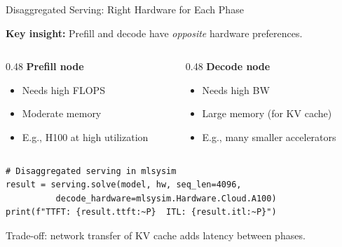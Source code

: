 \documentclass[aspectratio=169, 12pt]{beamer}
\begin{document}
\begin{frame}[fragile]{Disaggregated Serving: Right Hardware for Each Phase}

\small
\textbf{Key insight:} Prefill and decode have \textit{opposite} hardware preferences.

\begin{columns}[T]
\begin{column}{0.48\textwidth}
\textbf{Prefill node}
\begin{itemize}\setlength\itemsep{2pt}
  \item Needs high FLOPS
  \item Moderate memory
  \item E.g., H100 at high utilization
\end{itemize}
\end{column}
\begin{column}{0.48\textwidth}
\textbf{Decode node}
\begin{itemize}\setlength\itemsep{2pt}
  \item Needs high BW
  \item Large memory (for KV cache)
  \item E.g., many smaller accelerators
\end{itemize}
\end{column}
\end{columns}

\vspace{0.3cm}
\begin{lstlisting}
# Disaggregated serving in mlsysim
result = serving.solve(model, hw, seq_len=4096,
          decode_hardware=mlsysim.Hardware.Cloud.A100)
print(f"TTFT: {result.ttft:~P}  ITL: {result.itl:~P}")
\end{lstlisting}

\vspace{0.2cm}
\alert{Trade-off: network transfer of KV cache adds latency between phases.}
\end{frame}
\end{document}
